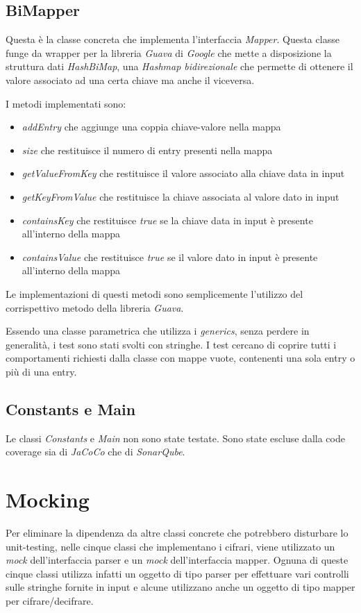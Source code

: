 		\subsection{BiMapper}
				Questa è la classe concreta che implementa l'interfaccia \emph{Mapper}. Questa classe funge da wrapper per la libreria \emph{Guava} di \emph{Google} che mette a disposizione la struttura dati \emph{HashBiMap}, una \emph{Hashmap bidirezionale} che permette di ottenere il valore associato ad una certa chiave ma anche il viceversa.
				
				I metodi implementati sono:
				\begin{itemize}
					\item \emph{addEntry} che aggiunge una coppia chiave-valore nella mappa
					\item \emph{size} che restituisce il numero di entry presenti nella mappa
					\item \emph{getValueFromKey} che restituisce il valore associato alla chiave data in input
					\item \emph{getKeyFromValue} che restituisce la chiave associata al valore dato in input
					\item \emph{containsKey} che restituisce \emph{true} se la chiave data in input è presente all'interno della mappa
					\item \emph{containsValue} che restituisce \emph{true} se il valore dato in input è presente all'interno della mappa
				\end{itemize}
				
				Le implementazioni di questi metodi sono semplicemente l'utilizzo del corrispettivo metodo della libreria \emph{Guava}. 
				
				Essendo una classe parametrica che utilizza i \emph{generics}, senza perdere in generalità, i test sono stati svolti con stringhe. I test cercano di coprire tutti i comportamenti richiesti dalla classe con mappe vuote, contenenti una sola entry o più di una entry.
				
			\subsection{Constants e Main}
				Le classi \emph{Constants} e \emph{Main} non sono state testate. Sono state escluse dalla code coverage sia di \emph{JaCoCo} che di \emph{SonarQube}.
			
	\section{Mocking}
		Per eliminare la dipendenza da altre classi concrete che potrebbero disturbare lo unit-testing, nelle cinque classi che implementano i cifrari, viene utilizzato un \emph{mock} dell'interfaccia parser e un \emph{mock} dell'interfaccia mapper. Ognuna di queste cinque classi utilizza infatti un oggetto di tipo parser per effettuare vari controlli sulle stringhe fornite in input e alcune utilizzano anche un oggetto di tipo mapper per cifrare/decifrare.
		
